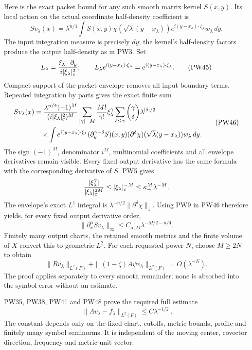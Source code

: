 \documentclass[
  11pt,
]{article}
\begin{document}
Here is the exact packet bound for any such smooth matrix kernel
\(S(x,y)\). Its local action on the actual coordinate half-density
coefficient is \[
 Sv_\lambda(x)=\lambda^{n/4}
       \int S(x,y)\chi(\sqrt\lambda(y-x_\lambda))
           e^{i(y-x_\lambda)\cdot\xi_\lambda}w_\lambda\,dy .
 \tag{PW44}
\] The input integration measure is precisely \(dy\); the kernel's
half-density factors produce the output half-density as in PW3. Set \[
 L_\lambda=\frac{\xi_\lambda\cdot\partial_y}
                   {i|\xi_\lambda|_{\rm c}^2};
 \qquad
 L_\lambda e^{i(y-x_\lambda)\cdot\xi_\lambda}
             =e^{i(y-x_\lambda)\cdot\xi_\lambda}.
 \tag{PW45}
\] Compact support of the packet envelope removes all input boundary
terms. Repeated integration by parts gives the exact finite sum \[
 \begin{split}
 Sv_\lambda(x)
 &=\frac{\lambda^{n/4}(-1)^M}
             {(i|\xi_\lambda|_{\rm c}^2)^M}
      \sum_{|\gamma|=M}\frac{M!}{\gamma!}\xi_\lambda^\gamma
      \sum_{\delta\leq\gamma}{\gamma\choose\delta}
           \lambda^{|\delta|/2}\\
 &\quad{}\times\int e^{i(y-x_\lambda)\cdot\xi_\lambda}
       (\partial_y^{\gamma-\delta}S)(x,y)
       (\partial^\delta\chi)(\sqrt\lambda(y-x_\lambda))
                w_\lambda\,dy .
 \end{split}
 \tag{PW46}
\] The sign \((-1)^M\), denominator \(i^M\), multinomial coefficients
and all envelope derivatives remain visible. Every fixed output
derivative has the same formula with the corresponding derivative of
\(S\). PW5 gives \[
 \frac{|\xi_\lambda^\gamma|}
          {|\xi_\lambda|_{\rm c}^{2M}}
 \leq|\xi_\lambda|_{\rm c}^{-M}
 \leq\kappa_+^M\lambda^{-M}.
\] The envelope's exact \(L^1\) integral is
\(\lambda^{-n/2}\|\partial^\delta\chi\|_1\). Using PW9 in PW46 therefore
yields, for every fixed output derivative order, \[
 \|\partial_x^\alpha Sv_\lambda\|_\infty
       \leq C_{\alpha,M}\lambda^{-M/2-n/4}.
 \tag{PW47}
\] Finitely many output charts, the retained smooth metrics and the
finite volume of \(X\) convert this to geometric \(L^2\). For each
requested power \(N\), choose \(M\geq2N\) to obtain \[
 \|Rv_\lambda\|_{L^2(F)}
       +\|(1-\zeta)A\psi v_\lambda\|_{L^2(F)}
       =O(\lambda^{-N}).
 \tag{PW48}
\] The proof applies separately to every smooth remainder; none is
absorbed into the symbol error without an estimate.

PW35, PW38, PW41 and PW48 prove the required full estimate \[
 \boxed{\ \|Av_\lambda-f_\lambda\|_{L^2(F)}
                  \leq C\lambda^{-1/2}\ } .
 \tag{PW49}
\] The constant depends only on the fixed chart, cutoffs, metric bounds,
profile and finitely many symbol seminorms. It is independent of the
moving center, covector direction, frequency and metric-unit vector.
\end{document}
